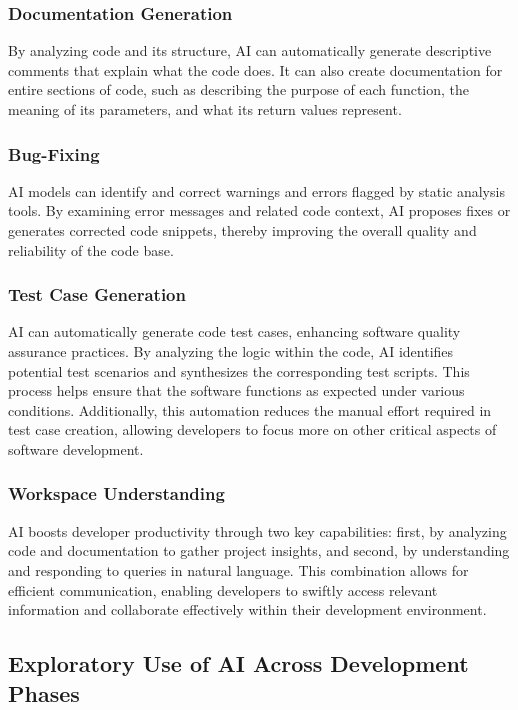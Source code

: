 \documentclass{article}
\begin{document}
\subsubsection{Documentation Generation}
By analyzing code and its structure, AI can automatically generate descriptive comments that explain what the code does. It 
can also create documentation for entire sections of code, such as describing the purpose of each function, the meaning of 
its parameters, and what its return values represent.\cite{agarwal2024copilot}

\subsubsection{Bug-Fixing}
AI models can identify and correct warnings and errors flagged by static analysis tools. By examining error messages and 
related code context, AI proposes fixes or generates corrected code snippets, thereby improving the overall quality and 
reliability of the code base.\cite{agarwal2024copilot}

\subsubsection{Test Case Generation}
AI can automatically generate code test cases, enhancing software quality assurance practices. By 
analyzing the logic within the code, AI identifies potential test scenarios and synthesizes the corresponding test scripts. 
This process helps ensure that the software functions as expected under various conditions. Additionally, this automation 
reduces the manual effort required in test case creation, allowing developers to focus more on other critical aspects of 
software development.\cite{crawford2023ai}\cite{agarwal2024copilot}


\subsubsection{Workspace Understanding}
AI boosts developer productivity through two key capabilities: first, by analyzing code and documentation to gather project 
insights, and second, by understanding and responding to queries in natural language. This combination allows for efficient 
communication, enabling developers to swiftly access relevant information and collaborate effectively within their development 
environment.

\subsection{Exploratory Use of AI Across Development Phases}
\end{document}
